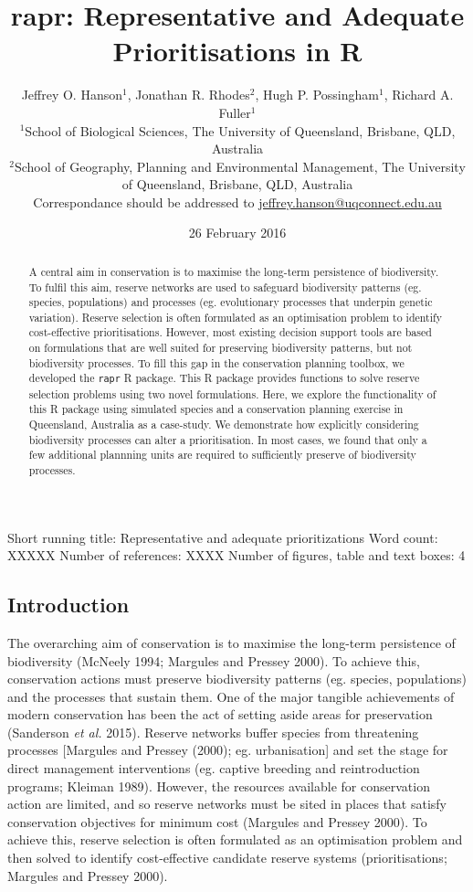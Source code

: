\documentclass[11pt,]{article}
\title{rapr: Representative and Adequate Prioritisations in R}
\author{Jeffrey O. Hanson$^1$, Jonathan R. Rhodes$^2$, Hugh P. Possingham$^1$,
Richard A. Fuller$^1$\\$^1$School of Biological Sciences, The University
of Queensland, Brisbane, QLD, Australia\\$^2$School of Geography,
Planning and Environmental Management, The University of Queensland,
Brisbane, QLD, Australia\\Correspondance should be addressed to
\href{mailto:jeffrey.hanson@uqconnect.edu.au}{jeffrey.hanson@uqconnect.edu.au}}
\date{26 February 2016}
\begin{document}
\maketitle

\begin{abstract}
A central aim in conservation is to maximise the long-term persistence
of biodiversity. To fulfil this aim, reserve networks are used to
safeguard biodiversity patterns (eg. species, populations) and processes
(eg. evolutionary processes that underpin genetic variation). Reserve
selection is often formulated as an optimisation problem to identify
cost-effective prioritisations. However, most existing decision support
tools are based on formulations that are well suited for preserving
biodiversity patterns, but not biodiversity processes. To fill this gap
in the conservation planning toolbox, we developed the \texttt{rapr} R
package. This R package provides functions to solve reserve selection
problems using two novel formulations. Here, we explore the
functionality of this R package using simulated species and a
conservation planning exercise in Queensland, Australia as a case-study.
We demonstrate how explicitly considering biodiversity processes can
alter a prioritisation. In most cases, we found that only a few
additional plannning units are required to sufficiently preserve of
biodiversity processes.
\end{abstract}

Short running title: Representative and adequate prioritizations
\newline
Word count: XXXXX \newline
Number of references: XXXX \newline
Number of figures, table and text boxes: 4 \newline
\newpage

\newpage
\setcounter{tocdepth}{5} \hypersetup{linkcolor=black} \tableofcontents
\newpage

\subsection{Introduction}\label{introduction}

The overarching aim of conservation is to maximise the long-term
persistence of biodiversity (McNeely 1994; Margules and Pressey 2000).
To achieve this, conservation actions must preserve biodiversity
patterns (eg. species, populations) and the processes that sustain them.
One of the major tangible achievements of modern conservation has been
the act of setting aside areas for preservation (Sanderson \emph{et al.}
2015). Reserve networks buffer species from threatening processes
{[}Margules and Pressey (2000); eg. urbanisation{]} and set the stage
for direct management interventions (eg. captive breeding and
reintroduction programs; Kleiman 1989). However, the resources available
for conservation action are limited, and so reserve networks must be
sited in places that satisfy conservation objectives for minimum cost
(Margules and Pressey 2000). To achieve this, reserve selection is often
formulated as an optimisation problem and then solved to identify
cost-effective candidate reserve systems (prioritisations; Margules and
Pressey 2000).
\end{document}
